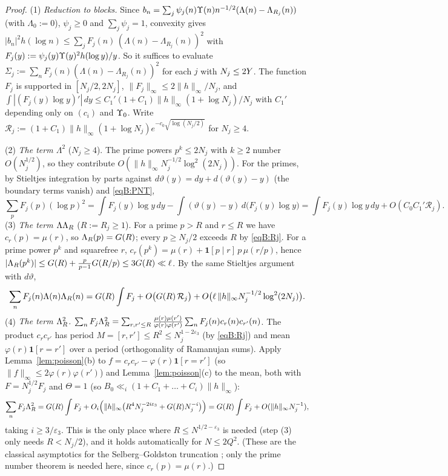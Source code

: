 \begin{proof}
(1) \emph{Reduction to blocks.} Since $b_n=\sum_j\psi_j(n)\Upsilon(n)n^{-1/2}(\Lambda(n)-\Lambda_{R_j}(n))$ (with $\Lambda_0:=0$), $\psi_j\ge0$ and
$\sum_j\psi_j=1$, convexity gives $|b_n|^2h(\log n)\le\sum_jF_j(n)\,(\Lambda(n)-\Lambda_{R_j}(n))^2$ with
$F_j(y):=\psi_j(y)\Upsilon(y)^2h(\log y)/y$. So it suffices to evaluate $\Sigma_j:=\sum_nF_j(n)(\Lambda(n)-\Lambda_{R_j}(n))^2$ for each $j$ with
$N_j\le2Y$. The function $F_j$ is supported in $[N_j/2,2N_j]$, $\|F_j\|_\infty\le2\|h\|_\infty/N_j$, and
$\int|(F_j(y)\log y)'|\,dy\le C_1'(1+C_1)\|h\|_\infty(1+\log N_j)/N_j$ with $C_1'$ depending only on $(c_i)$ and $\Upsilon_0$. Write
$\mathcal R_j:=(1+C_1)\|h\|_\infty(1+\log N_j)e^{-c_0\sqrt{\log(N_j/2)}}$ for $N_j\ge4$.

(2) \emph{The term $\Lambda^2$} ($N_j\ge4$). The prime powers $p^k\le2N_j$ with $k\ge2$ number $O(N_j^{1/2})$, so they contribute
$O(\|h\|_\infty N_j^{-1/2}\log^2(2N_j))$. For the primes, by Stieltjes integration by parts against $d\vartheta(y)=dy+d(\vartheta(y)-y)$ (the
boundary terms vanish) and \eqref{eqB:PNT},
\[
 \sum_pF_j(p)(\log p)^2=\int F_j(y)\log y\,dy-\int(\vartheta(y)-y)\,d\big(F_j(y)\log y\big)=\int F_j(y)\log y\,dy+O(C_0C_1'\mathcal R_j).
\]
(3) \emph{The term $\Lambda\Lambda_R$} ($R:=R_j\ge1$). For a prime $p>R$ and $r\le R$ we have $c_r(p)=\mu(r)$, so $\Lambda_R(p)=G(R)$; every $p\ge N_j/2$
exceeds $R$ by \eqref{eqB:Rj}. For a prime power $p^k$ and squarefree $r$, $c_r(p^k)=\mu(r)+\mathbf 1[p\mid r]\,p\,\mu(r/p)$, hence
$|\Lambda_R(p^k)|\le G(R)+\frac p{p-1}G(R/p)\le3G(R)\ll\ell$. By the same Stieltjes argument with $d\vartheta$,
\[
 \sum_nF_j(n)\Lambda(n)\Lambda_R(n)=G(R)\int F_j+O\big(G(R)\,\mathcal R_j\big)+O\big(\ell\,\|h\|_\infty N_j^{-1/2}\log^2(2N_j)\big).
\]
(4) \emph{The term $\Lambda_R^2$.} $\sum_nF_j\Lambda_R^2=\sum_{r,r'\le R}\frac{\mu(r)\mu(r')}{\varphi(r)\varphi(r')}\sum_nF_j(n)c_r(n)c_{r'}(n)$. The product
$c_rc_{r'}$ has period $M=[r,r']\le R^2\le N_j^{1-2\varepsilon_3}$ (by \eqref{eqB:Rj}) and mean $\varphi(r)\mathbf 1[r=r']$ over a period (orthogonality
of Ramanujan sums). Apply Lemma~\ref{lem:poisson}(b) to $f=c_rc_{r'}-\varphi(r)\mathbf 1[r=r']$ (so $\|f\|_\infty\le2\varphi(r)\varphi(r')$) and
Lemma~\ref{lem:poisson}(c) to the mean, both with $F=N_j^{1/2}F_j$ and $\Theta=1$ (so $B_0\ll_i(1+C_1+\dots+C_i)\|h\|_\infty$):
\[
 \sum_nF_j\Lambda_R^2=G(R)\int F_j+O_i\Big(\|h\|_\infty\big(R^4N_j^{-2i\varepsilon_3}+G(R)N_j^{-i}\big)\Big)=G(R)\int F_j+O(\|h\|_\infty N_j^{-1}),
\]
taking $i\ge3/\varepsilon_3$. This is the only place where $R\le N^{1/2-\varepsilon_3}$ is needed (step (3) only needs $R<N_j/2$), and it holds automatically for $N\le2Q^2$.
(These are the classical asymptotics for the Selberg--Goldston truncation \cite{Gold92,GY03,Gra78}; only the prime number theorem is
needed here, since $c_r(p)=\mu(r)$.)


\end{proof}

